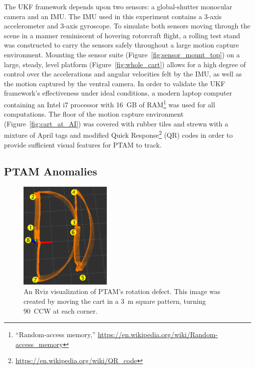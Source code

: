 The UKF framework depends upon two sensors: a global-shutter monocular camera and an IMU. The IMU used in this experiment contains a 3-axis accelerometer and 3-axis gyroscope. To simulate both sensors moving through the scene in a manner reminiscent of hovering rotorcraft flight, a rolling test stand was constructed to carry the sensors safely throughout a large motion capture environment. Mounting the sensor suite (Figure~\ref{fig:sensor_mount_top}) on a large, steady, level platform (Figure~\ref{fig:whole_cart}) allows for a high degree of control over the accelerations and angular velocities felt by the IMU, as well as the motion captured by the ventral camera. In order to validate the UKF framework's effectiveness under ideal conditions, a modern laptop computer containing an Intel i7 processor with 16~GB of RAM\footnote{``Random-access memory,'' \url{https://en.wikipedia.org/wiki/Random-access_memory}} was used for all computations. The floor of the motion capture environment (Figure~\ref{fig:cart_at_AI}) was covered with rubber tiles and strewn with a mixture of April tags and modified Quick Response\footnote{\url{https://en.wikipedia.org/wiki/QR_code}} (QR) codes in order to provide sufficient visual features for PTAM to track.

\subsection{PTAM Anomalies}

\begin{figure}
    \includegraphics[width=0.4\textwidth]{rot_bug_rviz}
  \caption[Rviz Visualization of Rotational Distortion]{An Rviz visualization of PTAM's rotation defect. This image was created by moving the cart in a 3~m square pattern, turning 90\textdegree\ CCW at each corner.}
  \label{fig:rot_bug_rviz}
\end{figure}

